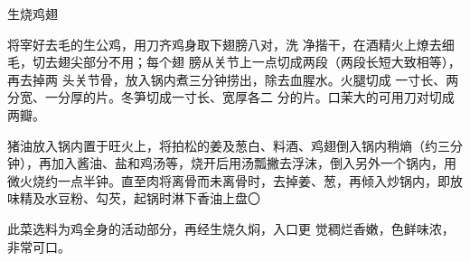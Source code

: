 \begin{recipe}[生烧大转弯]{生烧鸡翅}

\ingredients


\cooking

\step 将宰好去毛的生公鸡，用刀齐鸡身取下翅膀八对，洗
净揩干，在酒精火上燎去细毛，切去翅尖部分不用；每个翅 膀从关节上一点切成两段（两段长短大致相等），再去掉两 头关节骨，放入锅内煮三分钟捞出，除去血腥水。火腿切成 一寸长、两分宽、一分厚的片。冬笋切成一寸长、宽厚各二 分的片。口茉大的可用刀对切成两瓣。

\step 猪油放入锅内置于旺火上，将拍松的姜及葱白、料酒、鸡翅倒入锅内稍熵（约三分钟），再加入酱油、盐和鸡汤等，烧开后用汤瓢撇去浮沫，倒入另外一个锅内，用微火烧约一点半钟。直至肉将离骨而未离骨时，去掉姜、葱，再倾入炒锅内，即放味精及水豆粉、勾芡，起锅时淋下香油上盘〇

\notes

此菜选料为鸡全身的活动部分，再经生烧久焖，入口更 觉稠烂香嫩，色鲜味浓，非常可口。

\end{recipe}

